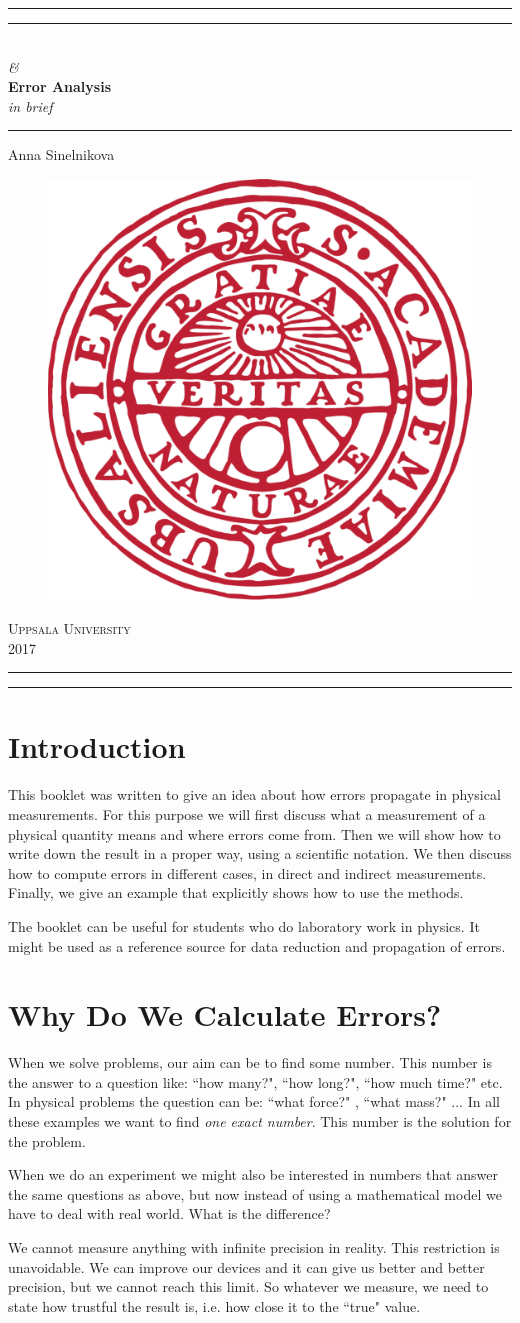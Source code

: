 \documentclass[12pt,a4paper]{article}
\newcommand*{\titleAT}{\begingroup %
\newlength{\drop} %
\drop=0.1\textheight %

\rule{\textwidth}{1pt}\par %
\vspace{2pt}\vspace{-\baselineskip} %
\rule{\textwidth}{0.4pt}\par %

\vspace{\drop} %
\centering %
\textcolor{UURed}{ %
{\fontsize{60}{70}\selectfont{Data Reduction}}\\[0.75\baselineskip] %
{\fontsize{40}{70}\textit{\&}}\\[0.75\baselineskip] %
{\fontsize{40}{70}\textbf{Error Analysis}}\\[0.75\baselineskip]
{\Large \textit{in brief}}} %


\vspace{0.10\drop} %
\rule{0.3\textwidth}{0.4pt}\par %
\vspace{\drop} %

{\Large \textsc Anna Sinelnikova}\par %

\vfill %
\begin{figure}[H]
\centering
\includegraphics[width=0.3\linewidth]{Uppsala_University_seal.pdf}
\end{figure}
{\large \textsc{Uppsala University\\2017}}\par %

\vspace*{\drop} %

\rule{\textwidth}{0.4pt}\par %
\vspace{2pt}\vspace{-\baselineskip} %
\rule{\textwidth}{1pt}\par %

\endgroup}
\begin{document}
\thispagestyle{empty} %
\titleAT

\newpage
\tableofcontents
\newpage

\section*{Introduction}
This booklet was written to give an idea about how errors propagate in physical measurements.
For this purpose we will first discuss what a measurement of a physical quantity means and where errors come from. Then we will show how to write down the result in a proper way, using a scientific notation. We then discuss how to compute errors in different cases, in direct and indirect measurements. Finally, we give an example that explicitly shows how to use the methods.

The booklet can be useful for students who do laboratory work in physics. It might be used as a reference source for data reduction and propagation of errors.

\section{Why Do We Calculate Errors?}
When we solve problems, our aim can be to find some number. This number is the answer to a question like: ``how many?", ``how long?", ``how much time?" etc. In physical problems the question can be: ``what force?"
, ``what mass?" ... In all these examples we want to find \textit{one exact number}. This number is the solution for the problem.

When we do an experiment we might also be interested in numbers that answer the same questions as above, but now instead of using a mathematical model we have to deal with real world. What is the difference?

We cannot measure anything with infinite precision in reality. This restriction is unavoidable. We can improve our devices and it can give us better and better precision, but we cannot reach this limit. So whatever we measure, we need to state
how trustful the result is, i.e. how close it to the ``true" value.
\end{document}
